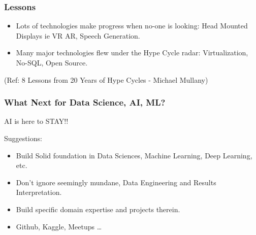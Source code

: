 \begin{frame}[fragile]\frametitle{Lessons}


\begin{itemize}
\item Lots of technologies make progress when no-one is looking: Head Mounted Displays ie VR AR, Speech Generation.
\item  Many major technologies flew under the Hype Cycle radar: Virtualization, No-SQL, Open Source.
\end{itemize}


{\tiny (Ref: 8 Lessons from 20 Years of Hype Cycles - Michael Mullany)}

\end{frame}



\begin{frame}[fragile]\frametitle{What Next for Data Science, AI, ML?}

AI is here to STAY!!

Suggestions:

\begin{itemize}
\item Build Solid foundation in Data Sciences, Machine Learning, Deep Learning, etc.
\item Don't ignore seemingly mundane, Data Engineering and Results Interpretation.
\item Build specific domain expertise and projects therein.
\item Github, Kaggle, Meetups \ldots
\end{itemize}

\end{frame}



